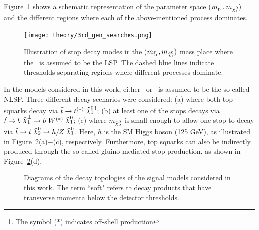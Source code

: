 				Figure~\ref{fig:stop_topologies} shows a schematic representation of the parameter space ($m_{\stopone}, m_{\ninoone})$ and the different regions where each of the above-mentioned process dominates. %

				\begin{figure}[!htb]
					\centering
					\texttt{[image: theory/3rd\_gen\_searches.png]}
					\caption{\label{fig:stop_topologies} Illustration of stop decay modes in the ($m_{\stopone}, m_{\ninoone})$ mass place where the \ninoone\ is assumed to be the \ac{LSP}. The dashed blue lines indicate thresholds separating regions where different processes dominate.}
				\end{figure}

				In the models considered in this work, either \ninotwo\ or \chinoonepm\ is assumed to be the so-called \ac{NLSP}. Three different decay scenarios were considered: (a) where both top squarks decay via $\stop\rightarrow t^{(*)}\ \ninoone$\footnote{The symbol (*) indicates off-shell production}; (b) at least one of the stops decays via $\stop\rightarrow b\ \chinoonepm \rightarrow b\ \Wboson^{(*)}\ \ninoone$; (c) where $m_{\ninotwo}$ is small enough to allow one stop to decay via $\stop\to t\ \ninotwo \to h/Z\ \ninoone$. Here, $h$ is the \ac{SM} Higgs boson (125 GeV), as illustrated in Figure~\ref{fig:feynDiagModels}(a)$-$(c), respectively. Furthermore, top squarks can also be indirectly produced through the so-called gluino-mediated stop production, as shown in Figure~\ref{fig:feynDiagModels}(d).

				\begin{figure}[!htb]
					\begin{center}
						\hspace{0.05\textwidth}
						\hspace{0.05\textwidth}
						\hspace{0.05\textwidth}
						\hspace{0.05\textwidth}
					\end{center}
					\caption{Diagrams of the decay topologies of the signal models considered in this work. The term ``soft" refers to decay products that have transverse momenta below the detector thresholds.}
					\label{fig:feynDiagModels}
				\end{figure}

